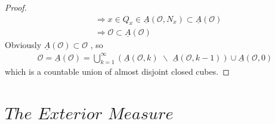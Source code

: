 \begin{thm}
\begin{proof}
\begin{align}
				&\Rightarrow x \in Q_x \in \underline{A}(\mathcal{O} , N_x) \subset \underline{A}(\mathcal{O}) \\
				&\Rightarrow \mathcal{O} \subset \underline{A}(\mathcal{O})
			\end{align}
			Obviously $\underline{A}(\mathcal{O}) \subset \mathcal{O}$ , so 
			\begin{align}
				\mathcal{O} = \underline{A}(\mathcal{O}) = \bigcup_{k = 1}^{\infty}{\left( \underline{A}(\mathcal{O} , k) \,\, \backslash \,\, \underline{A}(\mathcal{O} , k - 1) \right)} \cup \underline{A}(\mathcal{O} , 0)
			\end{align}
			which is a countable union of almost disjoint closed cubes.
		\end{proof}
	\end{thm}

\newpage
\section{$The \,\, Exterior \,\, Measure$}

